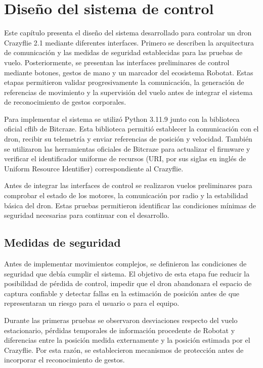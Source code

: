 
\chapter{Diseño del sistema de control}

Este capítulo presenta el diseño del sistema desarrollado para controlar un dron Crazyflie 2.1 mediante diferentes interfaces. Primero se describen la arquitectura de comunicación y las medidas de seguridad establecidas para las pruebas de vuelo. Posteriormente, se presentan las interfaces preliminares de control mediante botones, gestos de mano y un marcador del ecosistema Robotat. Estas etapas permitieron validar progresivamente la comunicación, la generación de referencias de movimiento y la supervisión del vuelo antes de integrar el sistema de reconocimiento de gestos corporales.

Para implementar el sistema se utilizó Python 3.11.9 junto con la biblioteca oficial cflib de Bitcraze. Esta biblioteca permitió establecer la comunicación con el dron, recibir su telemetría y enviar referencias de posición y velocidad. También se utilizaron las herramientas oficiales de Bitcraze para actualizar el firmware y verificar el identificador uniforme de recursos (URI, por sus siglas en inglés de Uniform Resource Identifier) correspondiente al Crazyflie.

Antes de integrar las interfaces de control se realizaron vuelos preliminares para comprobar el estado de los motores, la comunicación por radio y la estabilidad básica del dron. Estas pruebas permitieron identificar las condiciones mínimas de seguridad necesarias para continuar con el desarrollo.

\section{Medidas de seguridad}

Antes de implementar movimientos complejos, se definieron las condiciones de seguridad que debía cumplir el sistema. El objetivo de esta etapa fue reducir la posibilidad de pérdida de control, impedir que el dron abandonara el espacio de captura confiable y detectar fallas en la estimación de posición antes de que representaran un riesgo para el usuario o para el equipo.

Durante las primeras pruebas se observaron desviaciones respecto del vuelo estacionario, pérdidas temporales de información procedente de Robotat y diferencias entre la posición medida externamente y la posición estimada por el Crazyflie. Por esta razón, se establecieron mecanismos de protección antes de incorporar el reconocimiento de gestos.

